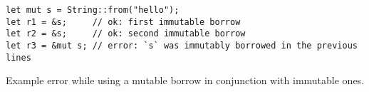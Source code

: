 \begin{listing}
    \begin{verbatim}
let mut s = String::from("hello");
let r1 = &s;     // ok: first immutable borrow
let r2 = &s;     // ok: second immutable borrow
let r3 = &mut s; // error: `s` was immutably borrowed in the previous lines
    \end{verbatim}
    \caption{Example error while using a mutable borrow in conjunction with immutable ones.}
    \label{lst:rust-borrow-n-immut-1-mut}
\end{listing}